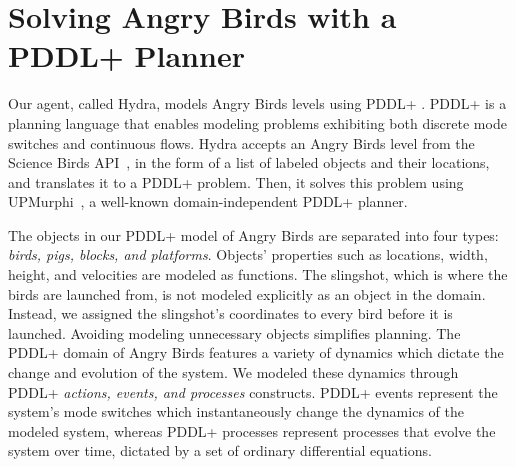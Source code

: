 \documentclass[letterpaper]{article} %
\begin{document}
\section{Solving Angry Birds with a PDDL+ Planner}



Our agent, called Hydra, models Angry Birds levels using PDDL+ \cite{fox2006modelling}. PDDL+ is a planning language that enables modeling problems exhibiting both discrete mode switches and continuous flows.
Hydra accepts an Angry Birds level from the Science Birds API~\cite{renz2019ai}, in the form of a list of labeled objects and their locations, and translates it to a PDDL+ problem.
Then, it solves this problem using  UPMurphi~\cite{della2009upmurphi}, a well-known domain-independent PDDL+ planner. %








The objects in our PDDL+ model of Angry Birds are separated into four types: \textit{birds, pigs, blocks, and platforms}.
Objects' properties such as locations, width, height, and velocities are modeled as functions. %
The slingshot, which is where the birds are launched from, is not modeled explicitly as an object in the domain. Instead, we assigned the slingshot's coordinates to every bird before it is launched.
Avoiding modeling unnecessary objects
simplifies planning. %
The PDDL+ domain of Angry Birds features a variety of dynamics which dictate the change and evolution of the system.
We modeled these dynamics through PDDL+ \emph{actions, events, and processes} constructs.
PDDL+ events represent the system's mode switches which instantaneously change the dynamics of the modeled system, whereas PDDL+ processes represent processes that evolve the system over time, dictated by a set of ordinary differential equations.
\end{document}

